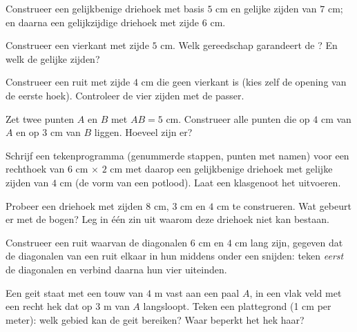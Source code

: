 \begin{exercise}[$\star$]\label{exo:g5:geometry:4}
Construeer een gelijkbenige driehoek met basis $5$ cm en gelijke zijden van
$7$ cm; en daarna een gelijkzijdige driehoek met zijde $6$ cm.
\end{exercise}

\begin{exercise}[$\star$]\label{exo:g5:geometry:5}
Construeer een vierkant met zijde $5$ cm. Welk gereedschap garandeert de
? En welk de gelijke zijden?
\end{exercise}

\begin{exercise}[$\star$]\label{exo:g5:geometry:6}
Construeer een ruit met zijde $4$ cm die geen vierkant is (kies zelf de
opening van de eerste hoek). Controleer de vier zijden met de passer.
\end{exercise}

\begin{exercise}[$\star$]\label{exo:g5:geometry:7}
Zet twee punten $A$ en $B$ met $AB = 5$ cm. Construeer alle punten die op $4$
cm van $A$ en op $3$ cm van $B$ liggen. Hoeveel zijn er?
\end{exercise}

\begin{exercise}[$\star$]\label{exo:g5:geometry:8}
Schrijf een tekenprogramma (genummerde stappen, punten met namen) voor een
rechthoek van $6$ cm $\times$ $2$ cm met daarop een gelijkbenige driehoek met
gelijke zijden van $4$ cm (de vorm van een potlood). Laat een klasgenoot het
uitvoeren.
\end{exercise}

\begin{exercise}[$\star\star$]\label{exo:g5:geometry:9}
Probeer een driehoek met zijden $8$ cm, $3$ cm en $4$ cm te construeren. Wat
gebeurt er met de bogen? Leg in één zin uit waarom deze driehoek niet kan
bestaan.
\end{exercise}

\begin{exercise}[$\star\star$]\label{exo:g5:geometry:10}
Construeer een ruit waarvan de diagonalen $6$ cm en $4$ cm lang zijn, gegeven
dat de diagonalen van een ruit elkaar in hun middens onder een 
snijden: teken \emph{eerst} de diagonalen en verbind daarna hun vier
uiteinden.
\end{exercise}

\begin{exercise}[$\star\star$]\label{exo:g5:geometry:11}
Een geit staat met een touw van $4$ m vast aan een paal $A$, in een vlak veld
met een recht hek dat op $3$ m van $A$ langsloopt. Teken een plattegrond (1 cm
per meter): welk gebied kan de geit bereiken? Waar beperkt het hek haar?
\end{exercise}
